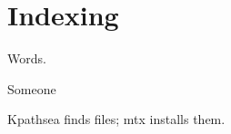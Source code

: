 \documentclass{memoir}
\begin{document}
\chapter{Indexing}
\epigraph{Words.}{Someone}
Kpathsea finds files; mtx installs them.
\printindex
\end{document}
